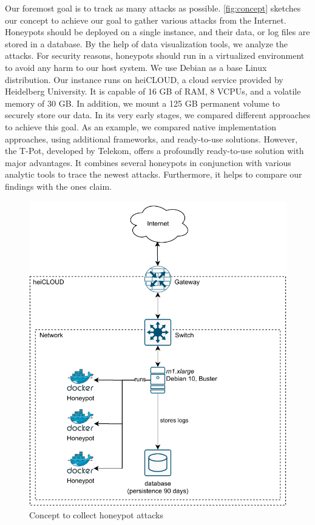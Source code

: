 Our foremost goal is to track as many attacks as possible.
\autoref{fig:concept} sketches our concept to achieve our goal to gather various attacks from the Internet.
Honeypots should be deployed on a single instance, and their data, or log files are stored in a database.
By the help of data visualization tools, we analyze the attacks.
For security reasons, honeypots should run in a virtualized environment to avoid any harm to our host system.
We use Debian as a base Linux distribution.
Our instance runs on heiCLOUD, a cloud service provided by Heidelberg University.
It is capable of 16 GB of RAM, 8 VCPUs, and a volatile memory of 30 GB.
In addition, we mount a 125 GB permanent volume to securely store our data.
In its very early stages, we compared different approaches to achieve this goal.
As an example, we compared native implementation approaches, using additional frameworks, and ready-to-use solutions.
However, the T-Pot, developed by Telekom, offers a profoundly ready-to-use solution with major advantages.
It combines several honeypots in conjunction with various analytic tools to trace the newest attacks.
Furthermore, it helps to compare our findings with the ones \citet{Kelly2021} claim.

\begin{figure}[ht]
    \centering
    \includegraphics{figures/tpot-concept.pdf}
    \caption[Draft for data collection]{Concept to collect honeypot attacks}
    \label{fig:concept}
\end{figure}

